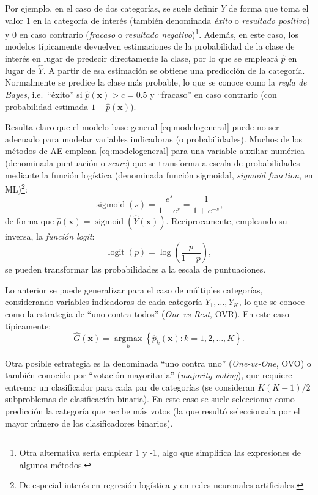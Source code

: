 \documentclass[
  spanish,
]{book}
\theoremstyle{break}
\theoremstyle{definition}
\theoremstyle{definition}
\theoremstyle{definition}
\theoremstyle{remark}
\begin{document}
Por ejemplo, en el caso de dos categorías, se suele definir \(Y\) de forma que toma el valor 1 en la categoría de interés (también denominada \emph{éxito} o \emph{resultado positivo}) y 0 en caso contrario (\emph{fracaso} o \emph{resultado negativo})\footnote{Otra alternativa sería emplear 1 y -1, algo que simplifica las expresiones de algunos métodos.}.
Además, en este caso, los modelos típicamente devuelven estimaciones de la probabilidad de la clase de interés en lugar de predecir directamente la clase, por lo que se empleará \(\hat p\) en lugar de \(\hat Y\).
A partir de esa estimación se obtiene una predicción de la categoría.
Normalmente se predice la clase más probable, lo que se conoce como la \emph{regla de Bayes}, i.e.~``éxito'' si \(\hat p(\mathbf{x}) > c = 0.5\) y ``fracaso'' en caso contrario (con probabilidad estimada \(1 - \hat p(\mathbf{x})\)).

Resulta claro que el modelo base general \eqref{eq:modelogeneral} puede no ser adecuado para modelar variables indicadoras (o probabilidades).
Muchos de los métodos de AE emplean \eqref{eq:modelogeneral} para una variable auxiliar numérica (denominada puntuación o \emph{score}) que se transforma a escala de probabilidades mediante la función logística (denominada función sigmoidal, \emph{sigmoid function}, en ML)\footnote{De especial interés en regresión logística y en redes neuronales artificiales.}:
\[\operatorname{sigmoid}(s) = \frac{e^s}{1 + e^s}= \frac{1}{1 + e^{-s}},\]
de forma que \(\hat p(\mathbf{x}) = \operatorname{sigmoid}(\hat Y(\mathbf{x}))\).
Reciprocamente, empleando su inversa, la \emph{función logit}:
\[\operatorname{logit}(p)=\log\left( \frac{p}{1-p} \right),\]
se pueden transformar las probabilidades a la escala de puntuaciones.

Lo anterior se puede generalizar para el caso de múltiples categorías, considerando variables indicadoras de cada categoría \(Y_1, \ldots, Y_K\), lo que se conoce como la estrategia de ``uno contra todos'' (\emph{One-vs-Rest}, OVR). En este caso típicamente:
\[\hat G \left(\mathbf{x} \right) = \underset{k}{\operatorname{argmax}} \left\{ \hat p_k(\mathbf{x}) : k = 1, 2, \ldots, K \right\}.\]

Otra posible estrategia es la denominada ``uno contra uno'' (\emph{One-vs-One}, OVO) o también conocido por ``votación mayoritaria'' (\emph{majority voting}), que requiere entrenar un clasificador para cada par de categorías (se consideran \(K(K-1)/2\) subproblemas de clasificación binaria).
En este caso se suele seleccionar como predicción la categoría que recibe más votos (la que resultó seleccionada por el mayor número de los clasificadores binarios).
\end{document}
